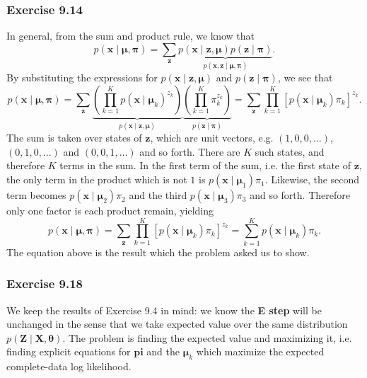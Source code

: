 \documentclass[12pt, a4paper]{article}
\newcommand{\vect}[1]{\bm{#1}}
\begin{document}
\subsubsection*{Exercise 9.14}
In general, from the sum and product rule, we know that
\begin{equation*}
	p(\vect{x} \mid \vect{\mu}, \vect{\pi})
	=
	\sum_{\vect{z}}
	\underbrace{p(\vect{x} \mid \vect{z}, \vect{\mu})
	p(\vect{z} \mid \vect{\pi})}_{p(\vect{x}, \vect{z} \mid  \vect{\mu}, \vect{\pi})}.
\end{equation*}
By substituting the expressions for $p(\vect{x} \mid \vect{z}, \vect{\mu})$ and $p(\vect{z} \mid \vect{\pi})$, we see that
\begin{equation*}
p(\vect{x} \mid \vect{\mu}, \vect{\pi})
=
	\sum_{\vect{z}} 
	\underbrace{\left( \prod_{k=1}^{K} p (\vect{x} \mid \vect{\mu}_k )^{z_k} \right)}_{p(\vect{x} \mid \vect{z}, \vect{\mu})}
	\underbrace{\left( \prod_{k=1}^{K} \pi_k^{z_k} \right)}_{p(\vect{z} \mid \vect{\pi})}
	=
	\sum_{\vect{z}}  \prod_{k=1}^{K} \left[ p (\vect{x} \mid \vect{\mu}_k ) \pi_k \right]^{z_k}.
\end{equation*}
The sum is taken over states of $\vect{z}$, which are unit vectors, e.g. $(1, 0, 0, \ldots)$, $(0, 1, 0, \ldots)$ and $(0, 0, 1, \ldots)$ and so forth.
There are $K$ such states, and therefore $K$ terms in the sum.
In the first term of the sum, i.e. the first state of $\vect{z}$, the only term in the product which is not $1$ is $p (\vect{x} \mid \vect{\mu}_1 ) \pi_1$.
Likewise, the second term becomes $p (\vect{x} \mid \vect{\mu}_2 ) \pi_2$ and the third $p (\vect{x} \mid \vect{\mu}_3 ) \pi_3$ and so forth.
Therefore only one factor is each product remain, yielding
\begin{equation*}
p(\vect{x} \mid \vect{\mu}, \vect{\pi})
=
	\sum_{\vect{z}}  \prod_{k=1}^{K} \left[ p (\vect{x} \mid \vect{\mu}_k ) \pi_k \right]^{z_k}
	=
	\sum_{k=1}^{K} p (\vect{x} \mid \vect{\mu}_k ) \pi_k.
\end{equation*}
The equation above is the result which the problem asked us to show.

\subsubsection*{Exercise 9.18}
We keep the results of Exercise 9.4 in mind: we know the \textbf{E step} will be unchanged in the sense that we take expected value over the same distribution $p(\vect{Z} \mid \vect{X}, \vect{\theta})$.
The problem is finding the expected value and maximizing it, i.e. finding explicit equations for $\vect{pi}$ and the $\vect{\mu}_k$ which maximize the expected complete-data log likelihood.
\end{document}
